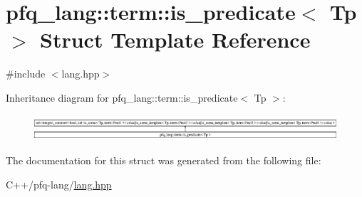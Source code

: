 \hypertarget{structpfq__lang_1_1term_1_1is__predicate}{\section{pfq\+\_\+lang\+:\+:term\+:\+:is\+\_\+predicate$<$ Tp $>$ Struct Template Reference}
\label{structpfq__lang_1_1term_1_1is__predicate}
}


{\ttfamily \#include $<$lang.\+hpp$>$}

Inheritance diagram for pfq\+\_\+lang\+:\+:term\+:\+:is\+\_\+predicate$<$ Tp $>$\+:\begin{figure}[H]
\begin{center}
\leavevmode
\includegraphics[height=0.960549cm]{structpfq__lang_1_1term_1_1is__predicate}
\end{center}
\end{figure}


The documentation for this struct was generated from the following file\+:\begin{DoxyCompactItemize}
\item 
C++/pfq-\/lang/\hyperlink{lang_8hpp}{lang.\+hpp}\end{DoxyCompactItemize}
